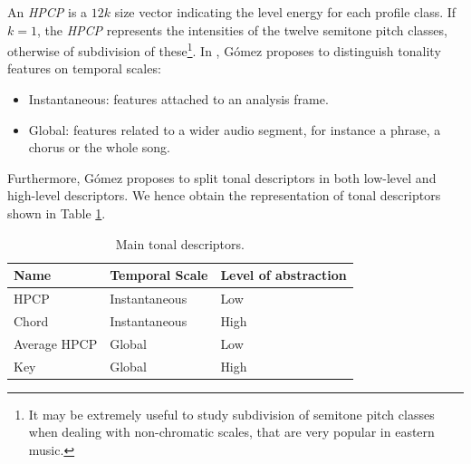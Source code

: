 An \textit{HPCP} is a $12k$ size vector indicating the level energy for each profile class. If $k=1$, the \textit{HPCP} represents the intensities of the twelve semitone pitch classes, otherwise of subdivision of these\footnote{It may be extremely useful to study subdivision of semitone pitch classes when dealing with non-chromatic scales, that are very popular in eastern music.}. In \cite{gomez06}, Gómez proposes to distinguish tonality features on temporal scales: 
\begin{itemize}
\item Instantaneous: features attached to an analysis frame.
\item Global: features related to a wider audio segment, for instance a phrase, a chorus or the whole song.
\end{itemize}
Furthermore, Gómez proposes to split tonal descriptors in both low-level and high-level descriptors. We hence obtain the representation of tonal descriptors shown in Table \ref{table:tonaldescriptors}.
\begin{table}[h]
\begin{center}
\begin{tabular} { l l l }
\hline
Name         & Temporal Scale & Level of abstraction \\ \hline
HPCP         & Instantaneous  & Low                  \\ 
Chord        & Instantaneous  & High                 \\ 
Average HPCP & Global         & Low                  \\ 
Key          & Global         & High                 \\ \hline
\end{tabular}
\caption[Main tonal descriptors]{Main tonal descriptors.}
\label{table:tonaldescriptors}
\end{center}
\end{table}

